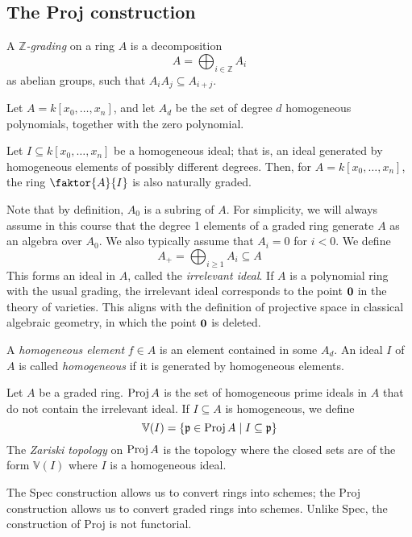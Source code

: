 \subsection{The Proj construction}
\begin{definition}
    A \emph{\( \mathbb Z \)-grading} on a ring \( A \) is a decomposition
    \[ A = \bigoplus_{i \in \mathbb Z} A_i \]
    as abelian groups, such that \( A_i A_j \subseteq A_{i+j} \).
\end{definition}
\begin{example}
    Let \( A = k[x_0, \dots, x_n] \), and let \( A_d \) be the set of degree \( d \) homogeneous polynomials, together with the zero polynomial.
\end{example}
\begin{example}
    Let \( I \subseteq k[x_0, \dots, x_n] \) be a homogeneous ideal; that is, an ideal generated by homogeneous elements of possibly different degrees.
    Then, for \( A = k[x_0, \dots, x_n] \), the ring \( \faktor{A}{I} \) is also naturally graded.
\end{example}
Note that by definition, \( A_0 \) is a subring of \( A \).
For simplicity, we will always assume in this course that the degree 1 elements of a graded ring generate \( A \) as an algebra over \( A_0 \).
We also typically assume that \( A_i = 0 \) for \( i < 0 \).
We define
\[ A_+ = \bigoplus_{i \geq 1} A_i \subseteq A \]
This forms an ideal in \( A \), called the \emph{irrelevant ideal}.
If \( A \) is a polynomial ring with the usual grading, the irrelevant ideal corresponds to the point \( \vb 0 \) in the theory of varieties.
This aligns with the definition of projective space in classical algebraic geometry, in which the point \( \vb 0 \) is deleted.

A \emph{homogeneous element} \( f \in A \) is an element contained in some \( A_d \).
An ideal \( I \) of \( A \) is called \emph{homogeneous} if it is generated by homogeneous elements.
\begin{definition}
    Let \( A \) be a graded ring.
    \( \operatorname{Proj} A \) is the set of homogeneous prime ideals in \( A \) that do not contain the irrelevant ideal.
    If \( I \subseteq A \) is homogeneous, we define
    \[ \mathbb V(I) = \qty{\mathfrak p \in \operatorname{Proj}A \mid I \subseteq \mathfrak p} \]
    The \emph{Zariski topology} on \( \operatorname{Proj} A \) is the topology where the closed sets are of the form \( \mathbb V(I) \) where \( I \) is a homogeneous ideal.
\end{definition}
The Spec construction allows us to convert rings into schemes; the Proj construction allows us to convert graded rings into schemes.
Unlike Spec, the construction of Proj is not functorial.


